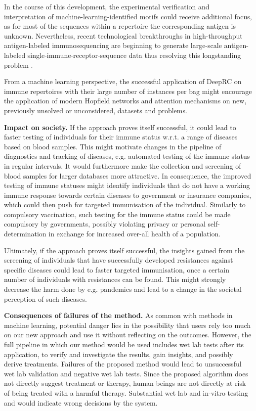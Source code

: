 \documentclass[oneside]{book}
\begin{document}
In the course of this development,
the experimental verification and interpretation of machine-learning-identified motifs could receive additional focus,
as for most of the sequences within a repertoire the corresponding antigen is 
unknown.
Nevertheless, recent technological breakthroughs in high-throughput 
antigen-labeled immunosequencing are beginning to generate large-scale antigen-labeled 
single-immune-receptor-sequence data thus resolving this longstanding problem \citep{setliff2019high}.

From a machine learning perspective, the successful application of DeepRC on immune repertoires with their large number of instances per bag might encourage the application of modern Hopfield networks and attention mechanisms on new, previously unsolved or unconsidered, datasets and problems.

%

\textbf{Impact on society.}
%
If the approach proves itself successful, it could lead to faster testing 
of individuals for their immune status w.r.t. a range of diseases based on 
blood samples.
This might motivate changes in the pipeline of diagnostics 
and tracking of diseases, e.g. automated testing of the immune status in 
regular intervals.
It would furthermore make the collection and screening 
of blood samples for larger databases more attractive.
In consequence, the improved testing of immune statuses might identify 
individuals that do not have a working immune response towards certain 
diseases to government or insurance companies, which could then push 
for targeted immunisation of the individual.
Similarly to compulsory 
vaccination, such testing for the immune status could be made compulsory 
by governments, possibly violating privacy or personal self-determination
in exchange for increased over-all health of a population.

Ultimately, if the approach proves itself successful, the insights gained from the screening of individuals that have successfully developed resistances against specific diseases could lead to faster targeted immunisation, once a certain number of individuals with resistances can be found.
This might strongly decrease the harm done by e.g. pandemics and lead to a change in the societal perception of such diseases.

\textbf{Consequences of failures of the method.}
%
As common with methods in machine learning, 
potential danger lies in the possibility that users rely too much on 
our new approach and use it without reflecting on the outcomes.
However, the full pipeline in which our method would be used includes wet lab tests after its application,
to verify and investigate the results, gain insights, and possibly derive treatments.
Failures of the proposed method would lead to unsuccessful wet lab validation and
negative wet lab tests.
Since the proposed algorithm does not directly suggest treatment or therapy,
human beings are not directly at risk of being treated with a harmful therapy.
Substantial wet lab and in-vitro testing and would indicate wrong decisions by the system.
\end{document}
